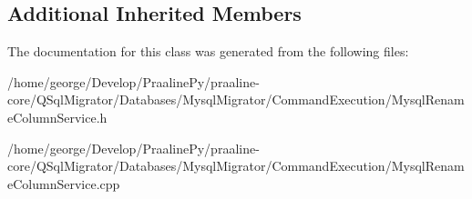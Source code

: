 \subsection*{Additional Inherited Members}


The documentation for this class was generated from the following files\+:\begin{DoxyCompactItemize}
\item 
/home/george/\+Develop/\+Praaline\+Py/praaline-\/core/\+Q\+Sql\+Migrator/\+Databases/\+Mysql\+Migrator/\+Command\+Execution/Mysql\+Rename\+Column\+Service.\+h\item 
/home/george/\+Develop/\+Praaline\+Py/praaline-\/core/\+Q\+Sql\+Migrator/\+Databases/\+Mysql\+Migrator/\+Command\+Execution/Mysql\+Rename\+Column\+Service.\+cpp\end{DoxyCompactItemize}
